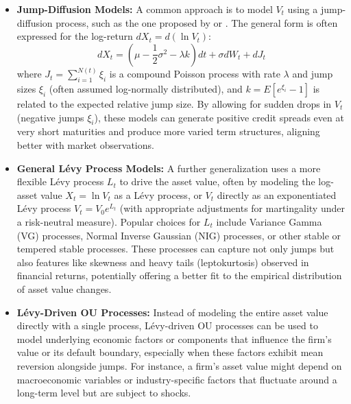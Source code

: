 \documentclass[11pt,twoside,openright]{report}
\begin{document}
\begin{itemize}
    \item \textbf{Jump-Diffusion Models:} A common approach is to model $V_t$ using a jump-diffusion process, such as the one proposed by \cite{merton1976option} or \cite{zhou1997jump}. The general form is often expressed for the log-return $dX_t = d(\ln V_t)$:
    \begin{equation}
    dX_t = (\mu - \frac{1}{2}\sigma^2 - \lambda k)dt + \sigma dW_t + dJ_t
    \label{eq:jump_diffusion}
    \end{equation}
    where $J_t = \sum_{i=1}^{N(t)} \xi_i$ is a compound Poisson process with rate $\lambda$ and jump sizes $\xi_i$ (often assumed log-normally distributed), and $k = E[e^{\xi_i} - 1]$ is related to the expected relative jump size. By allowing for sudden drops in $V_t$ (negative jumps $\xi_i$), these models can generate positive credit spreads even at very short maturities and produce more varied term structures, aligning better with market observations.

    \item \textbf{General Lévy Process Models:} A further generalization uses a more flexible Lévy process $L_t$ to drive the asset value, often by modeling the log-asset value $X_t = \ln V_t$ as a Lévy process, or $V_t$ directly as an exponentiated Lévy process $V_t = V_0 e^{L_t}$ (with appropriate adjustments for martingality under a risk-neutral measure). Popular choices for $L_t$ include Variance Gamma (VG) processes, Normal Inverse Gaussian (NIG) processes, or other stable or tempered stable processes. These processes can capture not only jumps but also features like skewness and heavy tails (leptokurtosis) observed in financial returns, potentially offering a better fit to the empirical distribution of asset value changes.

    \item \textbf{Lévy-Driven OU Processes:} Instead of modeling the entire asset value directly with a single process, Lévy-driven OU processes can be used to model underlying economic factors or components that influence the firm's value or its default boundary, especially when these factors exhibit mean reversion alongside jumps. For instance, a firm's asset value might depend on macroeconomic variables or industry-specific factors that fluctuate around a long-term level but are subject to shocks.
\end{itemize}
\end{document}
